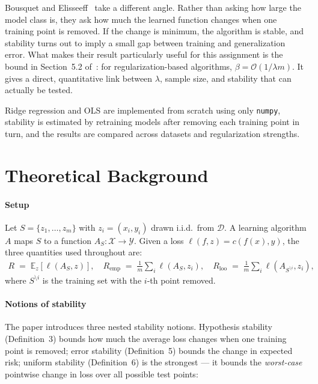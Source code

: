 \documentclass[11pt, a4paper, twoside]{article}
\newcommand{\E}{\mathbb{E}}
\newcommand{\AS}{A_S}
\newcommand{\ASi}{A_{S^{\setminus i}}}
\begin{document}
Bousquet and Elisseeff~\cite{bousquet2002} take a different angle.
Rather than asking how large the model class is, they ask how much the learned
function changes when one training point is removed.
If the change is minimum, the algorithm is stable, and stability turns out to
imply a small gap between training and generalization error.
What makes their result particularly useful for this assignment is the bound in
Section~5.2 of~\cite{bousquet2002}: for regularization-based algorithms,
$\beta = \mathcal{O}(1/\lambda m)$.
It gives a direct, quantitative link between $\lambda$, sample size, and stability
that can actually be tested.

Ridge regression and OLS are implemented from scratch using only \texttt{numpy},
stability is estimated by retraining models after removing each training point in
turn, and the results are compared across datasets and regularization strengths.

\section{Theoretical Background}

\paragraph{Setup}
Let $S = \{z_1, \ldots, z_m\}$ with $z_i = (x_i, y_i)$ drawn i.i.d.\ from $\mathcal{D}$.
A learning algorithm $A$ maps $S$ to a function $\AS : \mathcal{X} \to \mathcal{Y}$.
Given a loss $\ell(f, z) = c(f(x), y)$, the three quantities used throughout are:
\begin{align*}
    R \;=\; \E_z[\ell(\AS, z)], \quad
    R_\text{emp} \;=\; \tfrac{1}{m}\textstyle\sum_i \ell(\AS, z_i), \quad
    R_\text{loo} \;=\; \tfrac{1}{m}\textstyle\sum_i \ell(\ASi, z_i),
\end{align*}
where $S^{\setminus i}$ is the training set with the $i$-th point removed.

\paragraph{Notions of stability}
The paper introduces three nested stability notions.
Hypothesis stability (Definition~3) bounds how much the average loss changes when one
training point is removed; error stability (Definition~5) bounds the change in
expected risk; uniform stability (Definition~6) is the strongest --- it bounds the
\emph{worst-case} pointwise change in loss over all possible test points:
\end{document}
